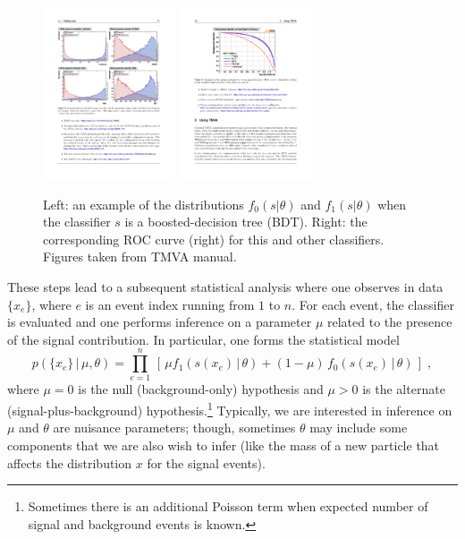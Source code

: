 \documentclass[11pt, oneside]{article}   	%
\begin{document}
\begin{figure}[htbp]
\begin{center}
 \includegraphics[height=2in]{example-TMVA-BDT.pdf}
 \includegraphics[height=2in]{example-TMVA-ROC.pdf}
\caption{Left: an example of the distributions $f_0(s|\theta)$ and $f_1(s|\theta)$ when the classifier $s$ is a boosted-decision tree (BDT). Right: the corresponding ROC curve (right) for this and other classifiers. Figures taken from TMVA manual.}
\label{fig:tmva}
\end{center}
\end{figure}

These steps lead to a subsequent statistical analysis where one observes in data $\{x_e\}$, where $e$ is an event index running from $1$ to $n$. For each event, the classifier is evaluated and one performs inference on a parameter $\mu$ related to the presence of the signal contribution. In particular, one forms the statistical model
\begin{equation}\label{eq:typicalML}
p( \{ x_e \} \,|\, \mu, \theta) = \prod_{e=1}^n \, \left[\, \mu f_1( s(x_e) \, |\,  \theta)  + (1-\mu)\, f_0( s(x_e) \,|\, \theta) \,\right] \; ,
\end{equation}
where $\mu=0$ is the null (background-only) hypothesis and $\mu>0$ is the alternate (signal-plus-background) hypothesis.\footnote{Sometimes there is an additional Poisson term when expected number of signal and background events is known.} Typically, we are interested in inference on $\mu$ and $\theta$ are nuisance parameters; though, sometimes $\theta$ may include some components that we are also wish to infer (like the mass of a new particle that affects the distribution $x$ for the signal events).
\end{document}
